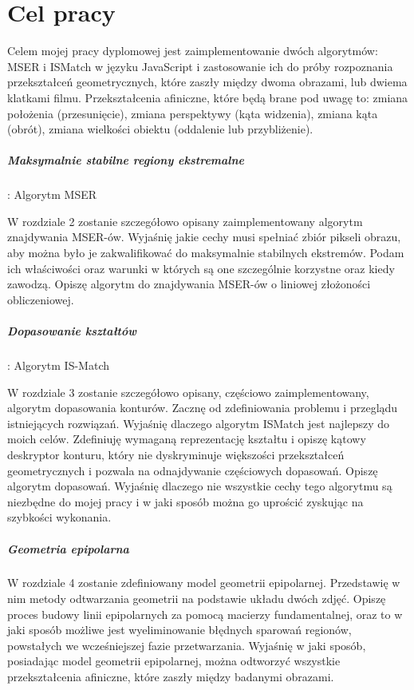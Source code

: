\section{Cel pracy}

Celem mojej pracy dyplomowej jest zaimplementowanie dwóch algorytmów: MSER i
ISMatch w języku JavaScript i zastosowanie ich do próby rozpoznania
przekształceń geometrycznych, które zaszły między dwoma obrazami, lub dwiema
klatkami filmu.  Przekształcenia afiniczne, które będą brane pod uwagę to:
zmiana położenia (przesunięcie), zmiana perspektywy (kąta widzenia), zmiana
kąta (obrót), zmiana wielkości obiektu (oddalenie lub przybliżenie).

\subparagraph{Maksymalnie stabilne regiony ekstremalne}: Algorytm MSER

W rozdziale 2 zostanie szczegółowo opisany zaimplementowany algorytm
znajdywania MSER-ów. Wyjaśnię jakie cechy musi spełniać zbiór pikseli obrazu,
aby można było je zakwalifikować do maksymalnie stabilnych ekstremów.  Podam
ich właściwości oraz warunki w których są one szczególnie korzystne oraz kiedy
zawodzą. Opiszę algorytm do znajdywania MSER-ów o liniowej złożoności
obliczeniowej.

\subparagraph{Dopasowanie kształtów}: Algorytm IS-Match

W rozdziale 3 zostanie szczegółowo opisany, częściowo zaimplementowany,
algorytm dopasowania konturów. Zacznę od zdefiniowania problemu i przeglądu
istniejących rozwiązań. Wyjaśnię dlaczego algorytm ISMatch jest najlepszy do
moich celów. Zdefiniuję wymaganą reprezentację kształtu i opiszę kątowy
deskryptor konturu, który nie dyskryminuje większości przekształceń
geometrycznych i pozwala na odnajdywanie częściowych dopasowań. Opiszę algorytm
dopasowań. Wyjaśnię dlaczego nie wszystkie cechy tego algorytmu są niezbędne do
mojej pracy i w jaki sposób można go uprościć zyskując na szybkości wykonania.

\subparagraph{Geometria epipolarna}

W rozdziale 4 zostanie zdefiniowany model geometrii epipolarnej. Przedstawię w
nim metody odtwarzania geometrii na podstawie układu dwóch zdjęć. Opiszę proces
budowy linii epipolarnych za pomocą macierzy fundamentalnej, oraz to w jaki
sposób możliwe jest wyeliminowanie błędnych sparowań regionów, powstałych we
wcześniejszej fazie przetwarzania. Wyjaśnię w jaki sposób, posiadając model
geometrii epipolarnej, można odtworzyć wszystkie przekształcenia afiniczne,
które zaszły między badanymi obrazami.

